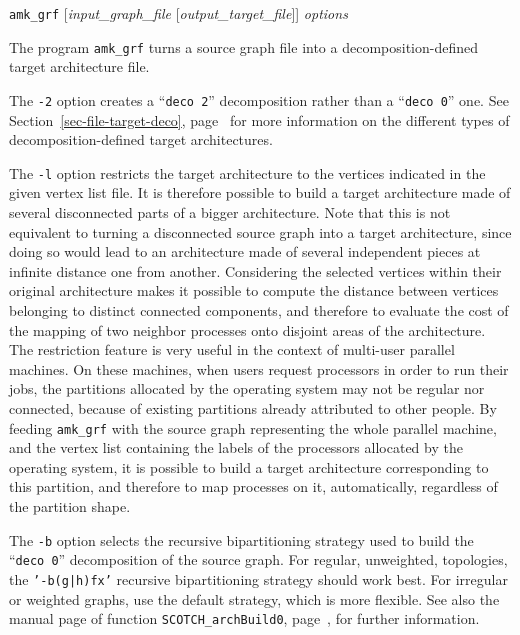 \begin{itemize}
\progsyn
\texttt{amk\_grf} [{\it input\_graph\_file} [{\it output\_target\_file}]] {\it options}

\progdes
The program \texttt{amk\_grf} turns a source graph file into a
decomposition-defined target architecture file.

The \texttt{-2} option creates a ``\texttt{deco~2}'' decomposition
rather than a ``\texttt{deco~0}'' one. See
Section~\ref{sec-file-target-deco},
page~\pageref{sec-file-target-deco} for more information on the
different types of decomposition-defined target architectures.

The \texttt{-l} option restricts the target architecture to the vertices indicated
in the given vertex list file. It is therefore possible
to build a target architecture made of several disconnected parts of a bigger
architecture.
Note that this is not equivalent to turning a disconnected source graph into
a target architecture, since doing so would lead to an architecture made of
several independent pieces at infinite distance one from another.
Considering the selected vertices within their original architecture makes
it possible to compute the distance between vertices belonging to distinct
connected components, and therefore to evaluate the cost of the mapping of
two neighbor processes onto disjoint areas of the architecture.
\\
The restriction feature is very useful in the context of multi-user parallel
machines. On these machines, when users request processors in order to run
their jobs, the partitions allocated by the operating system may not be
regular nor connected, because of existing partitions already attributed
to other people.
By feeding \texttt{amk\_grf} with the source graph representing the
whole parallel machine, and the vertex list containing the labels of the
processors allocated by the operating system, it is possible to build a
target architecture corresponding to this partition, and therefore to map
processes on it, automatically, regardless of the partition shape.

The \texttt{-b} option selects the recursive bipartitioning strategy used
to build the ``\texttt{deco~0}'' decomposition of the source
graph. For regular, unweighted, topologies, the \texttt{'-b(g|h)fx'}
recursive bipartitioning strategy should work best. For irregular or
weighted graphs, use the default strategy, which is more flexible. See
also the manual page of function \texttt{SCOTCH\_\lbt arch\lbo Build0},
page~\pageref{sec-lib-arch-build}, for further information.


\end{itemize}
